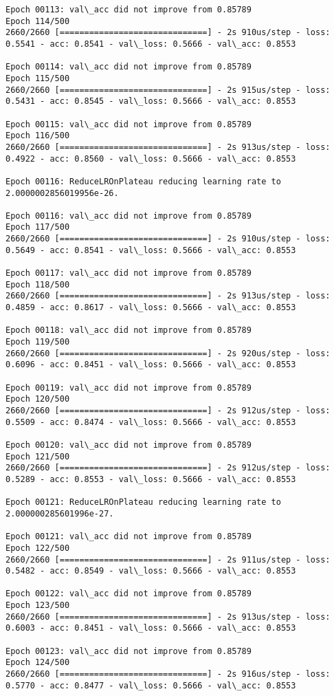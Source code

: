 \documentclass[11pt]{article}
\begin{document}
\begin{Verbatim}[commandchars=\\\{\}]
Epoch 00113: val\_acc did not improve from 0.85789
Epoch 114/500
2660/2660 [==============================] - 2s 910us/step - loss: 0.5541 - acc: 0.8541 - val\_loss: 0.5666 - val\_acc: 0.8553

Epoch 00114: val\_acc did not improve from 0.85789
Epoch 115/500
2660/2660 [==============================] - 2s 915us/step - loss: 0.5431 - acc: 0.8545 - val\_loss: 0.5666 - val\_acc: 0.8553

Epoch 00115: val\_acc did not improve from 0.85789
Epoch 116/500
2660/2660 [==============================] - 2s 913us/step - loss: 0.4922 - acc: 0.8560 - val\_loss: 0.5666 - val\_acc: 0.8553

Epoch 00116: ReduceLROnPlateau reducing learning rate to 2.0000002856019956e-26.

Epoch 00116: val\_acc did not improve from 0.85789
Epoch 117/500
2660/2660 [==============================] - 2s 910us/step - loss: 0.5649 - acc: 0.8541 - val\_loss: 0.5666 - val\_acc: 0.8553

Epoch 00117: val\_acc did not improve from 0.85789
Epoch 118/500
2660/2660 [==============================] - 2s 913us/step - loss: 0.4859 - acc: 0.8617 - val\_loss: 0.5666 - val\_acc: 0.8553

Epoch 00118: val\_acc did not improve from 0.85789
Epoch 119/500
2660/2660 [==============================] - 2s 920us/step - loss: 0.6096 - acc: 0.8451 - val\_loss: 0.5666 - val\_acc: 0.8553

Epoch 00119: val\_acc did not improve from 0.85789
Epoch 120/500
2660/2660 [==============================] - 2s 912us/step - loss: 0.5509 - acc: 0.8474 - val\_loss: 0.5666 - val\_acc: 0.8553

Epoch 00120: val\_acc did not improve from 0.85789
Epoch 121/500
2660/2660 [==============================] - 2s 912us/step - loss: 0.5289 - acc: 0.8553 - val\_loss: 0.5666 - val\_acc: 0.8553

Epoch 00121: ReduceLROnPlateau reducing learning rate to 2.000000285601996e-27.

Epoch 00121: val\_acc did not improve from 0.85789
Epoch 122/500
2660/2660 [==============================] - 2s 911us/step - loss: 0.5482 - acc: 0.8549 - val\_loss: 0.5666 - val\_acc: 0.8553

Epoch 00122: val\_acc did not improve from 0.85789
Epoch 123/500
2660/2660 [==============================] - 2s 913us/step - loss: 0.6003 - acc: 0.8451 - val\_loss: 0.5666 - val\_acc: 0.8553

Epoch 00123: val\_acc did not improve from 0.85789
Epoch 124/500
2660/2660 [==============================] - 2s 916us/step - loss: 0.5770 - acc: 0.8477 - val\_loss: 0.5666 - val\_acc: 0.8553


\end{Verbatim}
\end{document}
